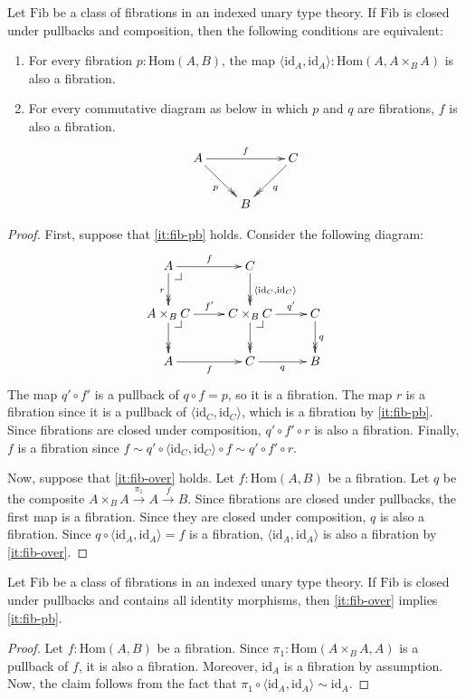 \documentclass[reqno]{mscs}
\makeatletter
\newcommand{\fs}[1]{\mathrm{#1}}
\newcommand{\Hom}{\fs{Hom}}
\newcommand{\id}{\fs{id}}
\newcommand{\Fib}{\fs{Fib}}
\numberwithin{figure}{section}
\newcommand{\pb}[1][dr]{\save*!/#1-1.2pc/#1:(-1,1)@^{|-}\restore}
\makeatother
\begin{document}
\begin{prop}
Let $\Fib$ be a class of fibrations in an indexed unary type theory.
If $\Fib$ is closed under pullbacks and composition, then the following conditions are equivalent:
\begin{enumerate}
\item \label{it:fib-pb} For every fibration $p : \Hom(A,B)$, the map $\langle \id_A, \id_A \rangle : \Hom(A, A \times_B A)$ is also a fibration.
\item \label{it:fib-over} For every commutative diagram as below in which $p$ and $q$ are fibrations, $f$ is also a fibration.
\[ \xymatrix{ A \ar[rr]^f \ar@{->>}[dr]_p &   & C \ar@{->>}[dl]^q \\
                                          & B &
            }\]
\end{enumerate}
\end{prop}
\begin{proof}
First, suppose that \eqref{it:fib-pb} holds.
Consider the following diagram:
\[ \xymatrix{ A \ar[r]^f \ar@{->>}[d]_r \pb             & C \ar@{->>}[d]^{\langle \id_C, \id_C \rangle} & \\
              A \times_B C \ar[r]^{f'} \ar@{->>}[d] \pb & C \times_B C \ar[r]^-{q'} \ar@{->>}[d] \pb    & C \ar@{->>}[d]^q \\
              A \ar[r]_f                                & C \ar[r]_q                                    & B
            } \]
The map $q' \circ f'$ is a pullback of $q \circ f = p$, so it is a fibration.
The map $r$ is a fibration since it is a pullback of $\langle \id_C, \id_C \rangle$, which is a fibration by \eqref{it:fib-pb}.
Since fibrations are closed under composition, $q' \circ f' \circ r$ is also a fibration.
Finally, $f$ is a fibration since $f \sim q' \circ \langle \id_C, \id_C \rangle \circ f \sim q' \circ f' \circ r$.

Now, suppose that \eqref{it:fib-over} holds.
Let $f : \Hom(A,B)$ be a fibration.
Let $q$ be the composite $A \times_B A \xrightarrow{\pi_1} A \xrightarrow{f} B$.
Since fibrations are closed under pullbacks, the first map is a fibration.
Since they are closed under composition, $q$ is also a fibration.
Since $q \circ \langle \id_A, \id_A \rangle = f$ is a fibration, $\langle \id_A, \id_A \rangle$ is also a fibration by \eqref{it:fib-over}.
\end{proof}

\begin{lem}
Let $\Fib$ be a class of fibrations in an indexed unary type theory.
If $\Fib$ is closed under pullbacks and contains all identity morphisms, then \eqref{it:fib-over} implies \eqref{it:fib-pb}.
\end{lem}
\begin{proof}
Let $f : \Hom(A,B)$ be a fibration.
Since $\pi_1 : \Hom(A \times_B A, A)$ is a pullback of $f$, it is also a fibration.
Moreover, $\id_A$ is a fibration by assumption.
Now, the claim follows from the fact that $\pi_1 \circ \langle \id_A, \id_A \rangle \sim \id_A$.
\end{proof}
\end{document}
